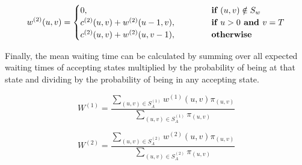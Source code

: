 \begin{equation} \label{eq:waiting_time_at_each_state_type_2}
    w^{(2)}(u,v) = 
    \begin{cases} 
        0, \hspace{4.85cm} & \textbf{if } (u,v) \notin S_w \\
        c^{(2)}(u,v) + w^{(2)}(u-1, v), & \textbf{if } u > 0 \textbf{ and } v = T \\
        c^{(2)}(u,v) + w^{(2)}(u, v-1), & \textbf{otherwise}
    \end{cases}
\end{equation}

Finally, the mean waiting time can be calculated by summing over all expected 
waiting times of accepting states multiplied by the probability of being at that 
state and dividing by the probability of being in any accepting state.

\begin{equation} \label{eq:recursive_waiting_time_type_1}
    W^{(1)} = \frac{\sum_{(u,v) \in S_A^{(1)}} w^{(1)}(u,v) 
    \pi_{(u,v)}}{\sum_{(u,v) \in S_A^{(1)}} \pi_{(u,v)}}
\end{equation}

\begin{equation}\label{eq:recursive_waiting_time_type_2}
    W^{(2)} = \frac{\sum_{(u,v) \in S_A^{(2)}} w^{(2)}(u,v) \pi_{(u,v)}}
    {\sum_{(u,v) \in S_A^{(2)}} \pi_{(u,v)}}
\end{equation}
